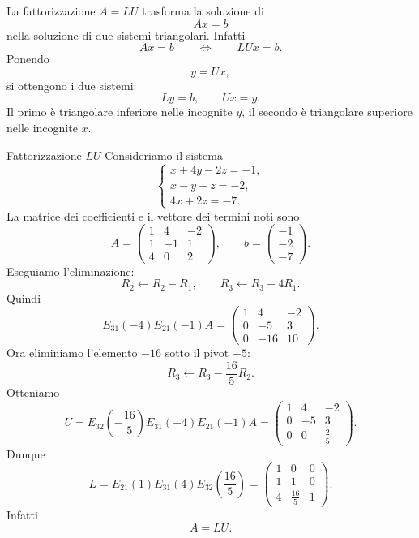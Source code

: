 \documentclass[a4paper]{article}
\begin{document}
La fattorizzazione \(A=LU\) trasforma la soluzione di
\[
    Ax=b
\]
nella soluzione di due sistemi triangolari. Infatti
\[
    Ax=b
    \qquad\Longleftrightarrow\qquad
    LUx=b.
\]
Ponendo
\[
    y=Ux,
\]
si ottengono i due sistemi:
\[
    Ly=b,
    \qquad
    Ux=y.
\]
Il primo è triangolare inferiore nelle incognite \(y\), il secondo è triangolare superiore nelle incognite \(x\).

\begin{snippetexample}{Fattorizzazione \(LU\)}
    Consideriamo il sistema
    \[
        \begin{cases}
            x+4y-2z=-1,\\
            x-y+z=-2,\\
            4x+2z=-7.
        \end{cases}
    \]
    La matrice dei coefficienti e il vettore dei termini noti sono
    \[
        A=
        \begin{pmatrix}
            1 & 4 & -2\\
            1 & -1 & 1\\
            4 & 0 & 2
        \end{pmatrix},
        \qquad
        b=
        \begin{pmatrix}
            -1\\
            -2\\
            -7
        \end{pmatrix}.
    \]
    Eseguiamo l'eliminazione:
    \[
        R_2\longleftarrow R_2-R_1,
        \qquad
        R_3\longleftarrow R_3-4R_1.
    \]
    Quindi
    \[
        E_{31}(-4)E_{21}(-1)A
        =
        \begin{pmatrix}
            1 & 4 & -2\\
            0 & -5 & 3\\
            0 & -16 & 10
        \end{pmatrix}.
    \]
    Ora eliminiamo l'elemento \(-16\) sotto il pivot \(-5\):
    \[
        R_3\longleftarrow R_3-\frac{16}{5}R_2.
    \]
    Otteniamo
    \[
        U=
        E_{32}\left(-\frac{16}{5}\right)
        E_{31}(-4)E_{21}(-1)A
        =
        \begin{pmatrix}
            1 & 4 & -2\\
            0 & -5 & 3\\
            0 & 0 & \frac{2}{5}
        \end{pmatrix}.
    \]
    Dunque
    \[
        L=
        E_{21}(1)E_{31}(4)E_{32}\left(\frac{16}{5}\right)
        =
        \begin{pmatrix}
            1 & 0 & 0\\
            1 & 1 & 0\\
            4 & \frac{16}{5} & 1
        \end{pmatrix}.
    \]
    Infatti
    \[
        A=LU.
    \]


\end{snippetexample}
\end{document}
